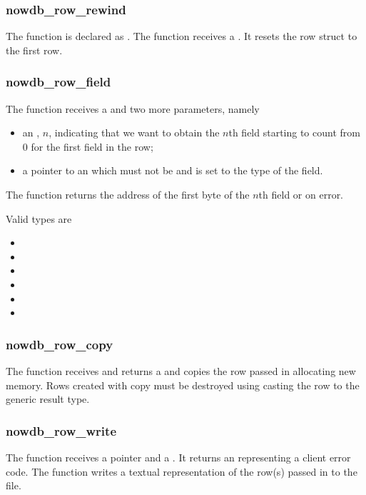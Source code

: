 \subsubsection{nowdb\_row\_rewind}
The function is declared as .
The function receives a .
It resets the row struct to the first row.

\subsubsection{nowdb\_row\_field}
The function receives a 
and two more parameters, namely
\begin{itemize}
\item an , $n$, indicating
that we want to obtain the $n$th field
starting to count from 0
for the first field in the row;
\item a pointer to an 
which must not be 
and is set to the type of the field.
\end{itemize}
The function returns the address
of the first byte of the $n$th field
or  on error.

Valid types are
\begin{itemize}
\item {}
\item {}
\item {}
\item {}
\item {}
\item {}
\end{itemize}

\subsubsection{nowdb\_row\_copy}
The function receives and returns
a  and
copies the row passed in allocating
new memory. Rows created with copy
must be destroyed using 
casting the row to the generic result type.

\subsubsection{nowdb\_row\_write}
The function receives a  pointer and
a .
It returns an  representing
a client error code.
The function writes a textual representation
of the row(s) passed in to the file.


